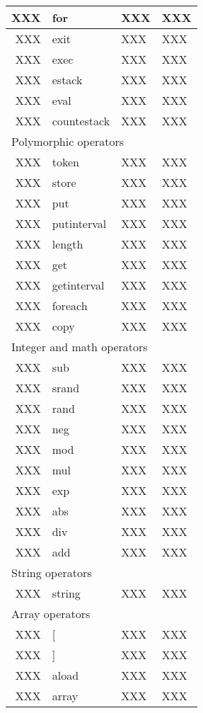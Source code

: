 \begin{longtable}{|r|l|l|p{4in}|}
\hline
XXX & for & XXX & XXX \\
\hline
XXX & exit & XXX & XXX \\
\hline
XXX & exec & XXX & XXX \\
\hline
XXX & estack & XXX & XXX \\
\hline
XXX & eval & XXX & XXX \\
\hline
XXX & countestack & XXX & XXX \\
\hline \hline
\multicolumn{4}{|l|}{Polymorphic operators} \\
\hline \hline
XXX & token & XXX & XXX \\
\hline
XXX & store & XXX & XXX \\
\hline
XXX & put & XXX & XXX \\
\hline
XXX & putinterval & XXX & XXX \\
\hline
XXX & length & XXX & XXX \\
\hline
XXX & get & XXX & XXX \\
\hline
XXX & getinterval & XXX & XXX \\
\hline
XXX & foreach & XXX & XXX \\
\hline
XXX & copy & XXX & XXX \\
\hline \hline
\multicolumn{4}{|l|}{Integer and math operators} \\
\hline \hline
XXX & sub & XXX & XXX \\
\hline
XXX & srand & XXX & XXX \\
\hline
XXX & rand & XXX & XXX \\
\hline
XXX & neg & XXX & XXX \\
\hline
XXX & mod & XXX & XXX \\
\hline
XXX & mul & XXX & XXX \\
\hline
XXX & exp & XXX & XXX \\
\hline
XXX & abs & XXX & XXX \\
\hline
XXX & div & XXX & XXX \\
\hline
XXX & add & XXX & XXX \\
\hline \hline
\multicolumn{4}{|l|}{String operators} \\
\hline \hline
XXX & string & XXX & XXX \\
\hline \hline
\multicolumn{4}{|l|}{Array operators} \\
\hline \hline
XXX & [ & XXX & XXX \\
\hline
XXX & ] & XXX & XXX \\
\hline
XXX & aload & XXX & XXX \\
\hline
XXX & array & XXX & XXX \\

\end{longtable}
